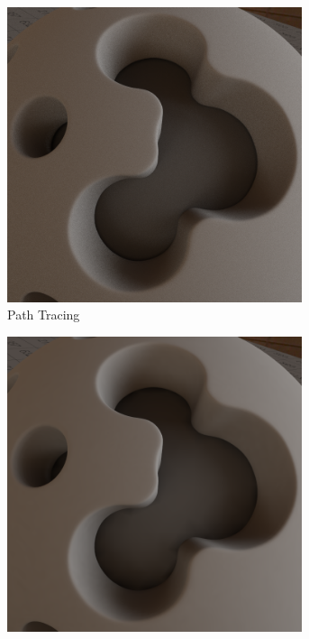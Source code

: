 	\begin{figure}[h]
		\begin{subfigure}[t]{0.33\textwidth}
			\center
			\includegraphics[width=0.95\textwidth]{pic/irrmap-shaderball_e3-ref.png}
			\caption{Path Tracing}
		\end{subfigure}
		\begin{subfigure}[t]{0.33\textwidth}
			\center
			\includegraphics[width=0.95\textwidth]{pic/irrmap-shaderball_e3-vmap.png}

\end{subfigure}
\end{figure}
